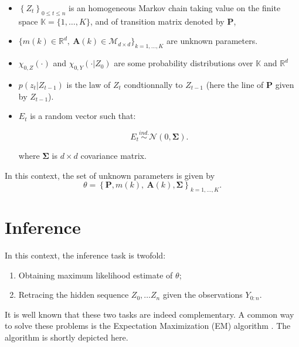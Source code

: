 \documentclass[]{book}
\providecommand{\tightlist}{%
  \setlength{\itemsep}{0pt}\setlength{\parskip}{0pt}}
\begin{document}
\begin{itemize}
\tightlist
\item
  \(\left\lbrace Z_t \right\rbrace_{0\leq t \leq n}\) is an homogeneous
  Markov chain taking value on the finite space
  \(\mathbb{K} = \lbrace1,\dots, K \rbrace\), and of transition matrix
  denoted by \(\mathbf{P}\),
\item
  \(\lbrace m(k)\in\mathbb{R}^d,~\mathbf{A}(k)\in \mathcal{M}_{d\times d}\rbrace_{k = 1,\dots, K}\)
  are unknown parameters.
\item
  \(\chi_{0, Z}(\cdot)\) and \(\chi_{0, Y}(\cdot \vert Z_0)\) are some
  probability distributions over \(\mathbb{K}\) and \(\mathbb{R}^d\)
\item
  \(p(z_t\vert Z_{t-1})\) is the law of \(Z_t\) condtionnally to
  \(Z_{t - 1}\) (here the line of \(\mathbf{P}\) given by
  \(Z_{t - 1}\)).
\item
  \(E_t\) is a random vector such that:

  \begin{equation*}
  E_t \overset{ind.}{\sim} \mathcal{N}\left(0, \mathbf{\Sigma}\right).
  \end{equation*}

  where \(\mathbf{\Sigma}\) is \(d\times d\) covariance matrix.
\end{itemize}

In this context, the set of unknown parameters is given by
\[\theta = \left\lbrace \mathbf{P}, m(k),~\mathbf{A}(k), \mathbf{\Sigma}\right \rbrace_{k = 1,\dots, K}.\]

\section{Inference}\label{inference-1}

In this context, the inference task is twofold:

\begin{enumerate}
\def\labelenumi{\arabic{enumi}.}
\tightlist
\item
  Obtaining maximum likelihood estimate of \(\theta\);
\item
  Retracing the hidden sequence \(Z_0,\dots Z_n\) given the observations
  \(Y_{0:n}\).
\end{enumerate}

It is well known that these two tasks are indeed complementary. A common
way to solve these problems is the Expectation Maximization (EM)
algorithm \citep{dempster1977maximum}. The algorithm is shortly depicted
here.
\end{document}

